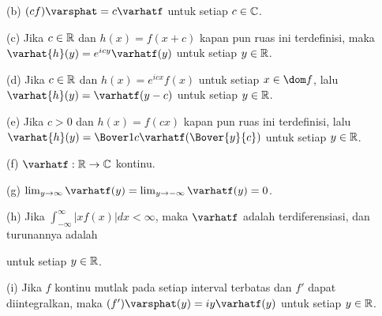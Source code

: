 (b) $(cf)\varsphat=c\varhatf$ untuk setiap $c\in\Bbb C$.

(c) Jika $c\in\Bbb R$ dan $h(x)=f(x+c)$ kapan pun ruas ini
terdefinisi, maka $\varhat{h}(y)=e^{icy}\varhatf(y)$ untuk setiap $y\in\Bbb R$.

(d) Jika $c\in\Bbb R$ dan $h(x)=e^{icx}f(x)$ untuk setiap
$x\in\dom f$, lalu $\varhat{h}(y)=\varhatf(y-c)$ untuk setiap
$y\in\Bbb R$.

(e) Jika $c>0$ dan $h(x)=f(cx)$ kapan pun ruas ini terdefinisi,
lalu $\varhat{h}(y)=\Bover1c\varhatf(\Bover{y}{c})$
untuk setiap $y\in\Bbb R$.

(f) $\varhatf:\Bbb R\to\Bbb C$ kontinu.

(g) $\lim_{y\to\infty}\varhatf(y)=\lim_{y\to-\infty}\varhatf(y)=0$.

(h) Jika $\int_{-\infty}^{\infty}|xf(x)|dx<\infty$, maka $\varhatf$ adalah
terdiferensiasi, dan turunannya adalah


\noindent untuk setiap $y\in\Bbb R$.

(i) Jika $f$ kontinu mutlak pada setiap interval terbatas dan $f'$
dapat diintegralkan, maka $(f')\varsphat(y)=iy\varhatf(y)$ untuk setiap $y\in\Bbb
R$.

